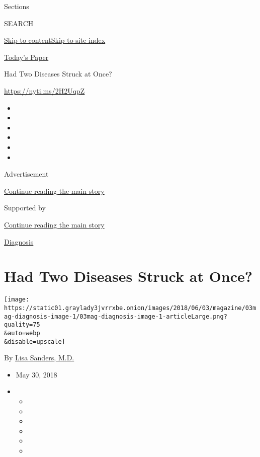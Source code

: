 Sections

SEARCH

\protect\hyperlink{site-content}{Skip to
content}\protect\hyperlink{site-index}{Skip to site index}

\href{https://myaccount.nytimes3xbfgragh.onion/auth/login?response_type=cookie\&client_id=vi}{}

\href{https://www.nytimes3xbfgragh.onion/section/todayspaper}{Today's
Paper}

Had Two Diseases Struck at Once?

\url{https://nyti.ms/2H2UqpZ}

\begin{itemize}
\item
\item
\item
\item
\item
\item
\end{itemize}

Advertisement

\protect\hyperlink{after-top}{Continue reading the main story}

Supported by

\protect\hyperlink{after-sponsor}{Continue reading the main story}

\href{/column/diagnosis}{Diagnosis}

\hypertarget{had-two-diseases-struck-at-once}{%
\section{Had Two Diseases Struck at
Once?}\label{had-two-diseases-struck-at-once}}

\texttt{[image: https://static01.graylady3jvrrxbe.onion/images/2018/06/03/magazine/03mag-diagnosis-image-1/03mag-diagnosis-image-1-articleLarge.png?quality=75\\\&auto=webp\\\&disable=upscale]}

By \href{https://www.nytimes3xbfgragh.onion/by/lisa-sanders-md}{Lisa
Sanders, M.D.}

\begin{itemize}
\item
  May 30, 2018
\item
  \begin{itemize}
  \item
  \item
  \item
  \item
  \item
  \item
  \end{itemize}
\end{itemize}

